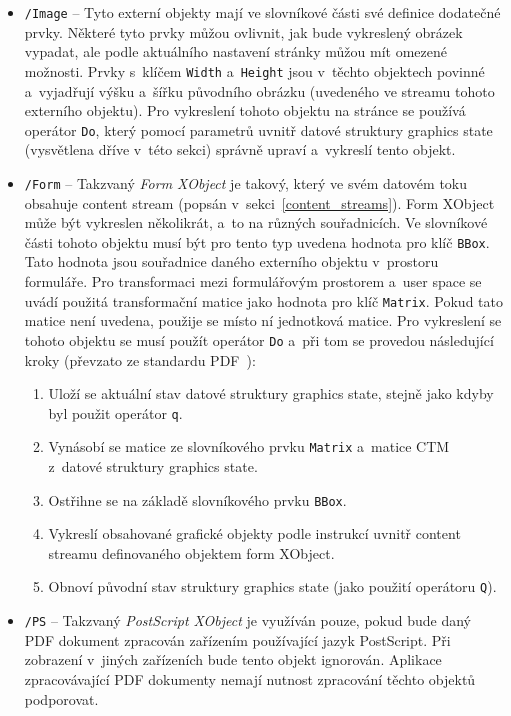 \begin{itemize}
    \item \texttt{/Image} -- Tyto externí objekty mají ve slovníkové části své
    definice dodatečné prvky. Některé tyto prvky můžou ovlivnit, jak bude
    vykreslený obrázek vypadat, ale podle aktuálního nastavení stránky můžou mít
    omezené možnosti. Prvky s~klíčem \texttt{Width} a~\texttt{Height}
    jsou v~těchto objektech povinné a~vyjadřují výšku a~šířku původního obrázku
    (uvedeného ve streamu tohoto externího objektu). Pro vykreslení
    tohoto objektu na stránce se používá operátor \texttt{Do}, který 
    pomocí parametrů uvnitř datové struktury graphics state (vysvětlena dříve
    v~této sekci) správně upraví a~vykreslí tento objekt.
    
    \item \texttt{/Form} -- Takzvaný \emph{Form XObject} je takový, který ve svém
    datovém toku obsahuje content stream (popsán v~sekci~\ref{content_streams}).
    Form XObject může být vykreslen několikrát, a~to na různých souřadnicích.
    Ve slovníkové části tohoto objektu musí být pro tento typ uvedena hodnota
    pro klíč \texttt{BBox}. Tato hodnota jsou souřadnice daného externího objektu
    v~prostoru formuláře. Pro transformaci mezi formulářovým prostorem a~user
    space se uvádí použitá transformační matice jako hodnota pro klíč
    \texttt{Matrix}. Pokud tato matice není uvedena, použije se místo ní
    jednotková matice. Pro vykreslení se tohoto objektu se musí použít operátor
    \texttt{Do} a~při tom se provedou následující kroky (převzato ze standardu
    PDF~\cite[k.~8.10.1, s.~218]{PDF32000-1:2008}):
    \begin{enumerate}
        \item Uloží se aktuální stav datové struktury graphics state, stejně
        jako kdyby byl použit operátor \texttt{q}.
        \item Vynásobí se matice ze slovníkového prvku \texttt{Matrix} a~matice
        CTM z~datové struktury graphics state.
        \item Ostřihne se na základě slovníkového prvku \texttt{BBox}.
        \item Vykreslí obsahované  grafické objekty podle instrukcí uvnitř content
        streamu definovaného objektem form XObject.
        \item Obnoví původní stav struktury graphics state (jako použití operátoru
        \texttt{Q}).
    \end{enumerate}
    
    \item \texttt{/PS} -- Takzvaný \emph{PostScript XObject} je využíván pouze,
    pokud bude daný PDF dokument zpracován zařízením používající jazyk PostScript.
    Při zobrazení v~jiných zařízeních bude tento objekt ignorován. Aplikace
    zpracovávající PDF dokumenty nemají nutnost zpracování těchto objektů
    podporovat.
\end{itemize}


